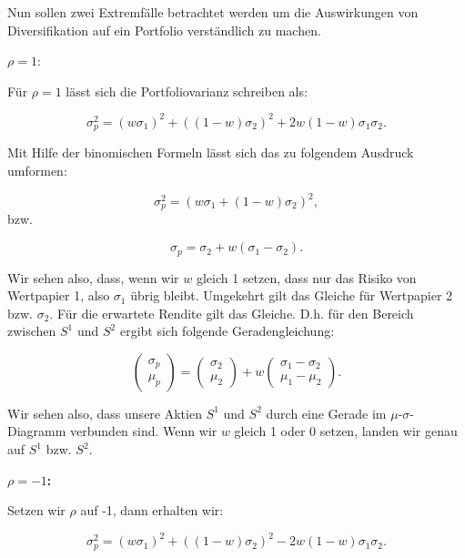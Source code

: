 \documentclass[parskip=half]{scrartcl}
\begin{document}
	Nun sollen zwei Extremfälle betrachtet werden um die Auswirkungen von Diversifikation auf ein Portfolio verständlich zu machen.
	
	\textbf{$\rho = 1$}:
	
	Für $\rho = 1$ lässt sich die Portfoliovarianz schreiben als:
	
	\begin{equation*}
		\sigma_p^2 = (w \sigma_1)^2 + ((1 - w) \sigma_2)^2 + 2w(1 - w)\sigma_1 \sigma_2 .
	\end{equation*}
	
	Mit Hilfe der binomischen Formeln lässt sich das zu folgendem Ausdruck umformen:
	
	\begin{equation*}
		\sigma_p^2 = (w \sigma_1 + (1-w)\sigma_2)^2 ,
	\end{equation*}
	bzw.
	
	\begin{equation*}
		\sigma_p = \sigma_2 + w(\sigma_1 - \sigma_2) .
	\end{equation*}
	
	Wir sehen also, dass, wenn wir $w$ gleich 1 setzen, dass nur das Risiko von Wertpapier 1, also $\sigma_1$ übrig bleibt. Umgekehrt gilt das Gleiche für Wertpapier 2 bzw. $\sigma_2$. Für die erwartete Rendite gilt das Gleiche. D.h. für den Bereich zwischen $S^1$ und $S^2$ ergibt sich folgende Geradengleichung:
	
	\begin{equation*}
		\begin{pmatrix} \sigma_p \\ \mu_p \end{pmatrix} = \begin{pmatrix} \sigma_2 \\ \mu_2 \end{pmatrix} + w \begin{pmatrix} \sigma_1 - \sigma_2 \\ \mu_1 - \mu_2 \end{pmatrix} .
	\end{equation*}
	
	Wir sehen also, dass unsere Aktien $S^1$ und $S^2$ durch eine Gerade im $\mu$-$\sigma$-Diagramm verbunden sind. Wenn wir $w$ gleich 1 oder 0 setzen, landen wir genau auf $S^1$ bzw. $S^2$.
	
	\textbf{$\rho = -1$:}
	
	Setzen wir $\rho$ auf -1, dann erhalten wir:
	
	\begin{equation*}
		\sigma_p^2 = (w \sigma_1)^2 + ((1 - w) \sigma_2)^2 - 2w(1 - w)\sigma_1 \sigma_2 .
	\end{equation*}
	
\end{document}
